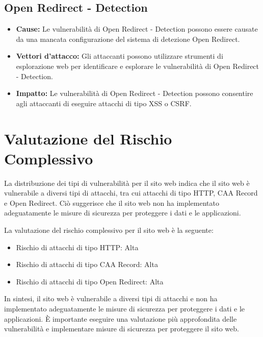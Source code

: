 \subsection{Open Redirect - Detection}
\begin{itemize}
\item \textbf{Cause:} Le vulnerabilità di Open Redirect - Detection possono essere causate da una mancata configurazione del sistema di detezione Open Redirect.
\item \textbf{Vettori d'attacco:} Gli attaccanti possono utilizzare strumenti di esplorazione web per identificare e esplorare le vulnerabilità di Open Redirect - Detection.
\item \textbf{Impatto:} Le vulnerabilità di Open Redirect - Detection possono consentire agli attaccanti di eseguire attacchi di tipo XSS o CSRF.
\end{itemize}
\section{Valutazione del Rischio Complessivo}

La distribuzione dei tipi di vulnerabilità per il sito web indica che il sito web è vulnerabile a diversi tipi di attacchi, tra cui attacchi di tipo HTTP, CAA Record e Open Redirect. Ciò suggerisce che il sito web non ha implementato adeguatamente le misure di sicurezza per proteggere i dati e le applicazioni.

La valutazione del rischio complessivo per il sito web è la seguente:
\begin{itemize}
\item Rischio di attacchi di tipo HTTP: Alta
\item Rischio di attacchi di tipo CAA Record: Alta
\item Rischio di attacchi di tipo Open Redirect: Alta
\end{itemize}
In sintesi, il sito web è vulnerabile a diversi tipi di attacchi e non ha implementato adeguatamente le misure di sicurezza per proteggere i dati e le applicazioni. È importante eseguire una valutazione più approfondita delle vulnerabilità e implementare misure di sicurezza per proteggere il sito web.


